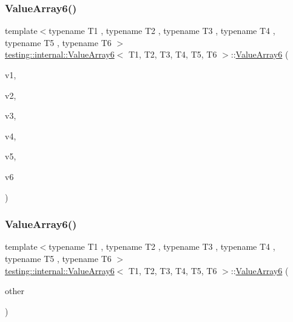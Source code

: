 \subsubsection{\texorpdfstring{ValueArray6()}{ValueArray6()}\hspace{0.1cm}{\footnotesize\ttfamily [1/2]}}
{\footnotesize\ttfamily template$<$typename T1 , typename T2 , typename T3 , typename T4 , typename T5 , typename T6 $>$ \\
\mbox{\hyperlink{classtesting_1_1internal_1_1ValueArray6}{testing\+::internal\+::\+Value\+Array6}}$<$ T1, T2, T3, T4, T5, T6 $>$\+::\mbox{\hyperlink{classtesting_1_1internal_1_1ValueArray6}{Value\+Array6}} (\begin{DoxyParamCaption}\item[{T1}]{v1,  }\item[{T2}]{v2,  }\item[{T3}]{v3,  }\item[{T4}]{v4,  }\item[{T5}]{v5,  }\item[{T6}]{v6 }\end{DoxyParamCaption})\hspace{0.3cm}{\ttfamily [inline]}}

\mbox{\label{classtesting_1_1internal_1_1ValueArray6_a270702109b4185c6749310902fed7456}} 
\subsubsection{\texorpdfstring{ValueArray6()}{ValueArray6()}\hspace{0.1cm}{\footnotesize\ttfamily [2/2]}}
{\footnotesize\ttfamily template$<$typename T1 , typename T2 , typename T3 , typename T4 , typename T5 , typename T6 $>$ \\
\mbox{\hyperlink{classtesting_1_1internal_1_1ValueArray6}{testing\+::internal\+::\+Value\+Array6}}$<$ T1, T2, T3, T4, T5, T6 $>$\+::\mbox{\hyperlink{classtesting_1_1internal_1_1ValueArray6}{Value\+Array6}} (\begin{DoxyParamCaption}\item[{const \mbox{\hyperlink{classtesting_1_1internal_1_1ValueArray6}{Value\+Array6}}$<$ T1, T2, T3, T4, T5, T6 $>$ \&}]{other }\end{DoxyParamCaption})\hspace{0.3cm}{\ttfamily [inline]}}



